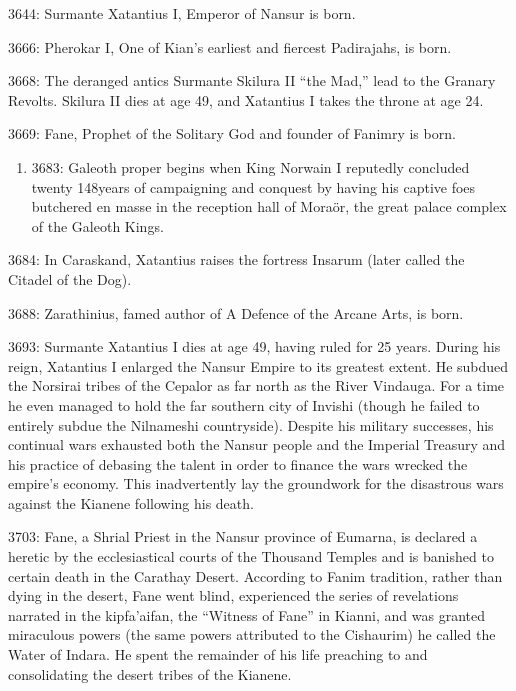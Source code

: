 \documentclass[]{book}
\providecommand{\tightlist}{%
  \setlength{\itemsep}{0pt}\setlength{\parskip}{0pt}}
\begin{document}
3644: Surmante Xatantius I, Emperor of Nansur is born.

3666: Pherokar I, One of Kian's earliest and fiercest Padirajahs, is born.

3668: The deranged antics Surmante Skilura II ``the Mad,'' lead to the Granary
Revolts. Skilura II dies at age 49, and Xatantius I takes the throne at age 24.

3669: Fane, Prophet of the Solitary God and founder of Fanimry is born.

\begin{enumerate}
\def\labelenumi{\alph{enumi}.}
\setcounter{enumi}{2}
\tightlist
\item
  3683: Galeoth proper begins when King Norwain I reputedly concluded twenty
  148years of campaigning and conquest by having his captive foes butchered en
  masse in the reception hall of Moraör, the great palace complex of the Galeoth
  Kings.
\end{enumerate}

3684: In Caraskand, Xatantius raises the fortress Insarum (later called the Citadel of
the Dog).

3688: Zarathinius, famed author of A Defence of the Arcane Arts, is born.

3693: Surmante Xatantius I dies at age 49, having ruled for 25 years. During his reign,
Xatantius I enlarged the Nansur Empire to its greatest extent. He subdued the
Norsirai tribes of the Cepalor as far north as the River Vindauga. For a time he
even managed to hold the far southern city of Invishi (though he failed to
entirely subdue the Nilnameshi countryside). Despite his military successes, his
continual wars exhausted both the Nansur people and the Imperial Treasury
and his practice of debasing the talent in order to finance the wars wrecked the
empire's economy. This inadvertently lay the groundwork for the disastrous
wars against the Kianene following his death.

3703: Fane, a Shrial Priest in the Nansur province of Eumarna, is declared a heretic
by the ecclesiastical courts of the Thousand Temples and is banished to certain
death in the Carathay Desert. According to Fanim tradition, rather than dying
in the desert, Fane went blind, experienced the series of revelations narrated in
the kipfa'aifan, the ``Witness of Fane'' in Kianni, and was granted miraculous
powers (the same powers attributed to the Cishaurim) he called the Water of
Indara. He spent the remainder of his life preaching to and consolidating the
desert tribes of the Kianene.
\end{document}
